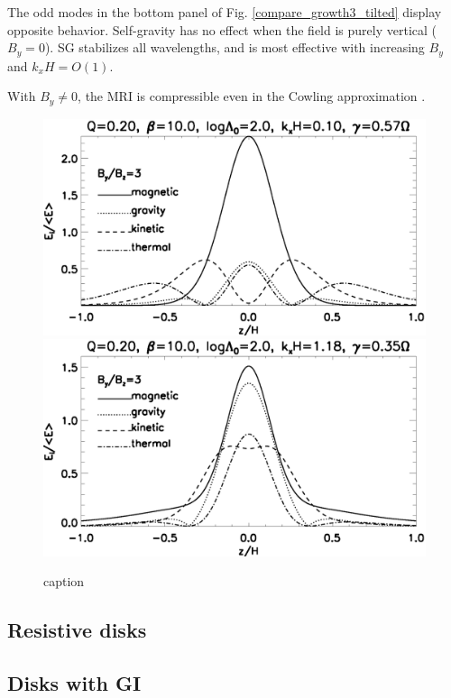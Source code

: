 
The odd modes in the bottom panel of Fig. \ref{compare_growth3_tilted}
display opposite behavior. Self-gravity has no effect when
the field is purely vertical ($B_y=0$). SG stabilizes all wavelengths,
and is most effective with increasing $B_y$ and $k_xH =  O(1)$. 



With $B_y\neq 0$, the MRI is compressible even in the Cowling
approximation \citep{pessah05}.   




\begin{figure}
  \includegraphics[width=\linewidth,clip=true,trim=0cm 1.5cm 0cm 0cm]{figures/result_tilted_kx0d1.ps} 
  \includegraphics[width=\linewidth,clip=true,trim=0cm 0cm 0cm 0.cm]{figures/result_tilted_kx1d2.ps}
  \caption{caption
    \label{result_tilted}}
\end{figure}




\subsection{Resistive disks}


\subsection{Disks with GI}

